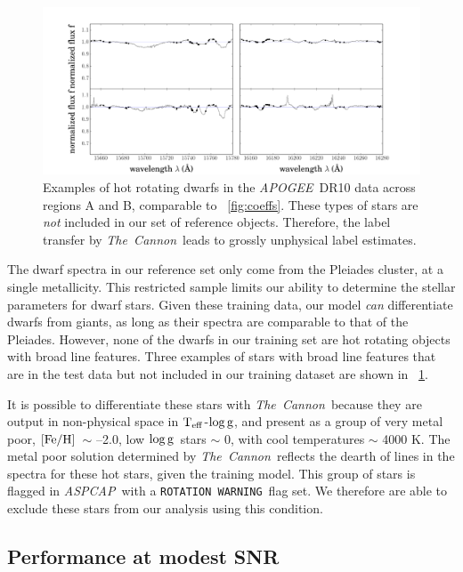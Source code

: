 \documentclass[12pt, preprint]{aastex}
\newcommand{\tc}{\textsl{The~Cannon}}
\newcommand{\apogee}{\textsl{APOGEE}}
\newcommand{\aspcap}{\textsl{ASPCAP}}
\newcommand{\rotwarn}{\texttt{ROTATION WARNING}}
\newcommand{\teff}{\mbox{$\rm T_{eff}$}}
\newcommand{\feh}{\mbox{$\rm [Fe/H]$}}
\newcommand{\logg}{\mbox{$\rm \log g$}}
\begin{document}
\begin{figure}[!h]
\centering
\includegraphics[width=\hsize]{./plots/2dwarfs.png}
\caption{Examples of hot rotating dwarfs in the \apogee\ DR10 data across regions A and B, comparable to \figurename~\ref{fig:coeffs}. These types of stars are \textit{not} included in our set of reference objects. Therefore, the label transfer by \tc\ leads to grossly unphysical label estimates.}
\label{fig:dwarfs}
\end{figure}


The dwarf spectra in our reference set only come from the Pleiades cluster, at a single metallicity. 
This restricted sample limits our ability to determine the stellar parameters for dwarf stars. 
Given these training data, our model \textit{can} differentiate dwarfs from giants, as long as their spectra are comparable to that of the Pleiades. 
However, none of the dwarfs in our training set are hot rotating objects with broad line features. 
Three examples of stars with broad line features that are in the test data but not included in our training dataset are shown in \figurename~\ref{fig:dwarfs}.

It is possible to differentiate these stars with \tc\ because they are output in non-physical space in \teff-\logg, and present as a group of very metal poor, \feh\ $\sim$ --2.0, low \logg\ stars $\sim$ 0, with cool temperatures $\sim$ 4000 K. The metal poor solution determined by \tc\ reflects the dearth of lines in the spectra for these hot stars, given the training model. This group of stars is flagged in \aspcap\ with a \rotwarn\ flag set. We therefore are able to exclude these stars from our analysis using this condition. 
 

 \subsection{Performance at modest SNR}
 \label{sec:lowSNR}
\end{document}
